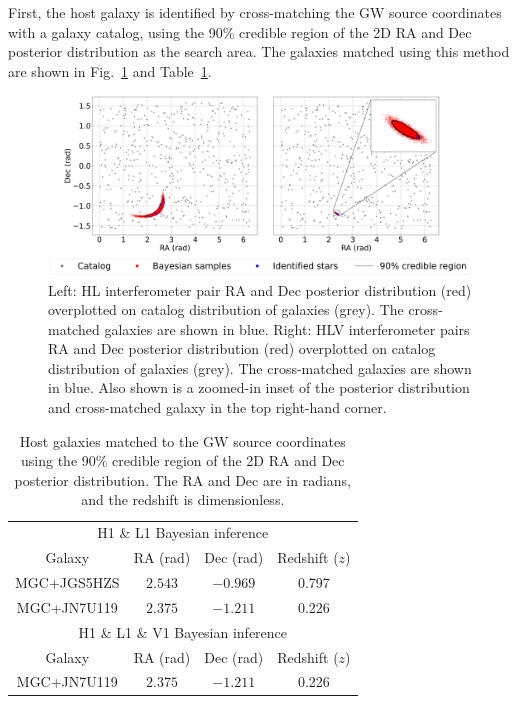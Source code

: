 \documentclass[11pt,a4paper]{article}
\begin{document}
First, the host galaxy is identified by cross-matching the GW source coordinates with a galaxy catalog, using the 90\% credible region of the 2D RA and Dec posterior distribution as the search area. The galaxies matched using this method are shown in Fig.~\ref{fig:matched_galaxies} and Table~\ref{tab:galaxies}.

\begin{figure}[h]
    \includegraphics[width=\columnwidth, keepaspectratio]{../figures/kde_crossmatch.png}
    \caption{Left: HL interferometer pair RA and Dec posterior distribution (red) overplotted on catalog distribution of galaxies (grey). The cross-matched galaxies are shown in blue. Right: HLV interferometer pairs RA and Dec posterior distribution (red) overplotted on catalog distribution of galaxies (grey). The cross-matched galaxies are shown in blue. Also shown is a zoomed-in inset of the posterior distribution and cross-matched galaxy in the top right-hand corner.}
    \label{fig:matched_galaxies}
\end{figure}

\begin{table}[h]
    \centering
    \begin{tabular}{c|c|c|c}
    \multicolumn{4}{c}{H1 \& L1 Bayesian inference} \\
    Galaxy & RA (rad) & Dec (rad) & Redshift ($z$) \\
    \hline
    MGC+JGS5HZS & $2.543$ & $-0.969$ & 0.797 \\
    MGC+JN7U119 & $2.375$ & $-1.211$ & 0.226 \\
    \hline
    \multicolumn{4}{c}{H1 \& L1 \& V1 Bayesian inference} \\
    Galaxy & RA (rad) & Dec (rad) & Redshift ($z$) \\
    \hline
    MGC+JN7U119 & $2.375$ & $-1.211$ & 0.226 \\
    \end{tabular}
    \caption{Host galaxies matched to the GW source coordinates using the 90\% credible region of the 2D RA and Dec posterior distribution. The RA and Dec are in radians, and the redshift is dimensionless.}
    \label{tab:galaxies}
\end{table}
\end{document}
